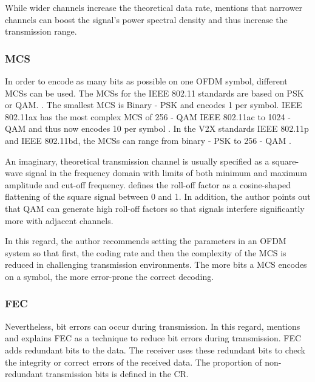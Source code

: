 While wider channels increase the theoretical data rate, \textcite{avallone_will_2021} mentions that narrower channels can
boost the signal's power spectral density and thus increase the transmission range.

\subsubsection*{\acf{MCS}}

In order to encode as many bits as possible on one \ac{OFDM} symbol, different \ac{MCS}s can be used.
The \ac{MCS}s for the IEEE 802.11 standards are based on \ac{PSK} or \ac{QAM}. \cite{kauffels_wireless_2002}.
The smallest \ac{MCS} is Binary - \ac{PSK} and encodes \SI{1}{\bit} per symbol.
IEEE 802.11ax has the most complex \ac{MCS} of \num{256} - \ac{QAM} IEEE 802.11ac to \num{1024} - \ac{QAM} and thus now encodes \SI{10}{\bit} per symbol \cite{afaqui_ieee_2017}.
In the \ac{V2X} standards IEEE 802.11p and IEEE 802.11bd, the \ac{MCS}s can range from binary - \ac{PSK} to \num{256} - \ac{QAM} \cite{jacob_system-level_2020}.

An imaginary, theoretical transmission channel is usually specified as a square-wave signal in the frequency domain
with limits of both minimum and maximum amplitude and cut-off frequency. \textcite{kauffels_wireless_2002} defines
the roll-off factor as a cosine-shaped flattening of the square signal between 0 and 1.
In addition, the author points
out that \ac{QAM} can generate high roll-off factors so that signals interfere significantly more with adjacent channels.

In this regard, the author recommends setting the parameters in an \ac{OFDM} system so that first, the coding
rate and then the complexity of the \ac{MCS} is reduced in challenging transmission environments. The more bits a \ac{MCS} encodes
on a symbol, the more error-prone the correct decoding.

\subsubsection*{\acf{FEC}}

Nevertheless, bit errors can occur during transmission. In this regard, \cite{kauffels_wireless_2002}
mentions and explains \ac{FEC} as a technique to reduce bit errors during transmission. \ac{FEC} adds redundant bits
to the data. The receiver uses these redundant bits to check the integrity or correct errors of the received data.
The proportion of non-redundant transmission bits is defined in the \ac{CR}.

